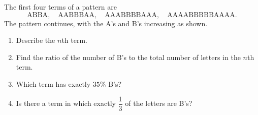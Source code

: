 The first four terms of a pattern are
\[
\text{ABBA},\quad\text{AABBBAA},\quad\text{AAABBBBAAA},\quad\text{AAAABBBBBAAAA}.
\]
The pattern continues, with the A's and B's increasing as shown.
\begin{enumerate}
\item[(a)] Describe the $n$th term.
\item[(b)] Find the ratio of the number of B's to the total number of letters in the $n$th term.
\item[(c)] Which term has exactly $35\%$ B's?
\item[(d)] Is there a term in which exactly $\dfrac{1}{3}$ of the letters are B's?
\end{enumerate}
